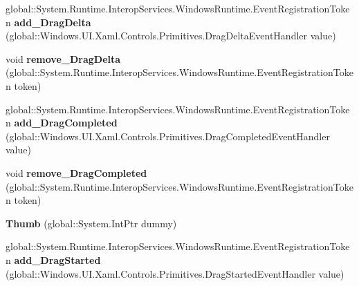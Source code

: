 \begin{DoxyCompactItemize}
\item 
\mbox{\label{class_windows_1_1_u_i_1_1_xaml_1_1_controls_1_1_primitives_1_1_thumb_ab21b89a45b43ce6913868468c69ad277}} 
global\+::\+System.\+Runtime.\+Interop\+Services.\+Windows\+Runtime.\+Event\+Registration\+Token {\bfseries add\+\_\+\+Drag\+Delta} (global\+::\+Windows.\+U\+I.\+Xaml.\+Controls.\+Primitives.\+Drag\+Delta\+Event\+Handler value)
\item 
\mbox{\label{class_windows_1_1_u_i_1_1_xaml_1_1_controls_1_1_primitives_1_1_thumb_aafa7ff7377726fee9d57013616690ae3}} 
void {\bfseries remove\+\_\+\+Drag\+Delta} (global\+::\+System.\+Runtime.\+Interop\+Services.\+Windows\+Runtime.\+Event\+Registration\+Token token)
\item 
\mbox{\label{class_windows_1_1_u_i_1_1_xaml_1_1_controls_1_1_primitives_1_1_thumb_a78452356d0361197920635b5002bf90f}} 
global\+::\+System.\+Runtime.\+Interop\+Services.\+Windows\+Runtime.\+Event\+Registration\+Token {\bfseries add\+\_\+\+Drag\+Completed} (global\+::\+Windows.\+U\+I.\+Xaml.\+Controls.\+Primitives.\+Drag\+Completed\+Event\+Handler value)
\item 
\mbox{\label{class_windows_1_1_u_i_1_1_xaml_1_1_controls_1_1_primitives_1_1_thumb_a097aeafd8ad0e07599e35793e0ef16ca}} 
void {\bfseries remove\+\_\+\+Drag\+Completed} (global\+::\+System.\+Runtime.\+Interop\+Services.\+Windows\+Runtime.\+Event\+Registration\+Token token)
\item 
\mbox{\label{class_windows_1_1_u_i_1_1_xaml_1_1_controls_1_1_primitives_1_1_thumb_acd7bc9b9e039aaac5e1b684e7f15f078}} 
{\bfseries Thumb} (global\+::\+System.\+Int\+Ptr dummy)
\item 
\mbox{\label{class_windows_1_1_u_i_1_1_xaml_1_1_controls_1_1_primitives_1_1_thumb_ab1e477ea93baeef13137c92d8314a13a}} 
global\+::\+System.\+Runtime.\+Interop\+Services.\+Windows\+Runtime.\+Event\+Registration\+Token {\bfseries add\+\_\+\+Drag\+Started} (global\+::\+Windows.\+U\+I.\+Xaml.\+Controls.\+Primitives.\+Drag\+Started\+Event\+Handler value)

\end{DoxyCompactItemize}
